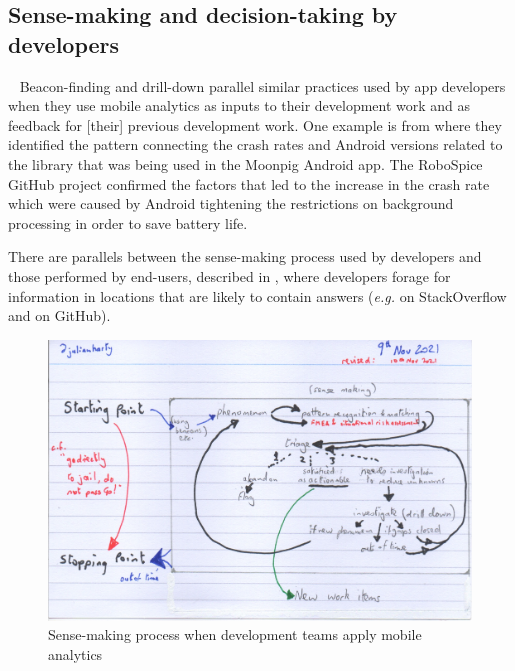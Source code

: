 \subsection{Sense-making and decision-taking by developers}~\label{aiu-sensemaking-and-decision-taking-by-developers-section}
Beacon-finding and drill-down parallel similar practices used by app developers when they use mobile analytics as inputs to their development work and as feedback for [their] previous development work. One example is from  where they identified the pattern connecting the crash rates and Android versions related to the  library that was being used in the Moonpig Android app. The RoboSpice GitHub project confirmed the factors that led to the increase in the crash rate which were caused by Android tightening the restrictions on background processing in order to save battery life. 

There are parallels between the sense-making process used by developers and those performed by end-users, described in , where developers forage for information in locations that are likely to contain answers (\emph{e.g.} on StackOverflow and on GitHub).

\begin{figure}
    \centering
    \includegraphics[width=\linewidth]{images/rough-sketches/practical-sense-making-process-10-nov-2021.jpeg}
    \caption{Sense-making process when development teams apply mobile analytics}
    \label{fig:practical-sense-making-process-when-dev-teams-apply-mobile-analytics}
\end{figure}


